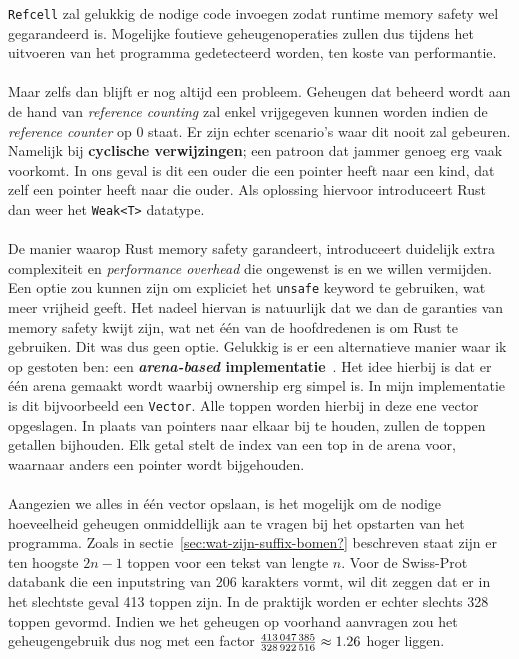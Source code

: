 \texttt{Refcell} zal gelukkig de nodige code invoegen zodat runtime memory safety wel gegarandeerd is.
Mogelijke foutieve geheugenoperaties zullen dus tijdens het uitvoeren van het programma gedetecteerd worden, ten koste van performantie.
\\ \\
Maar zelfs dan blijft er nog altijd een probleem.
Geheugen dat beheerd wordt aan de hand van \textit{reference counting} zal enkel vrijgegeven kunnen worden indien de \textit{reference counter} op 0 staat.
Er zijn echter scenario's waar dit nooit zal gebeuren.
Namelijk bij \textbf{cyclische verwijzingen}; een patroon dat jammer genoeg erg vaak voorkomt.
In ons geval is dit een ouder die een pointer heeft naar een kind, dat zelf een pointer heeft naar die ouder.
Als oplossing hiervoor introduceert Rust dan weer het \texttt{Weak<T>} datatype.
\\ \\
De manier waarop Rust memory safety garandeert, introduceert duidelijk extra complexiteit en \textit{performance overhead} die ongewenst is en we willen vermijden.
Een optie zou kunnen zijn om expliciet het \texttt{unsafe} keyword te gebruiken, wat meer vrijheid geeft.
Het nadeel hiervan is natuurlijk dat we dan de garanties van memory safety kwijt zijn, wat net één van de hoofdredenen is om Rust te gebruiken.
Dit was dus geen optie.
Gelukkig is er een alternatieve manier waar ik op gestoten ben: een \textbf{\textit{arena-based} implementatie}~\cite{rust_arena_trees}.
Het idee hierbij is dat er één arena gemaakt wordt waarbij ownership erg simpel is.
In mijn implementatie is dit bijvoorbeeld een \texttt{Vector}.
Alle toppen worden hierbij in deze ene vector opgeslagen.
In plaats van pointers naar elkaar bij te houden, zullen de toppen getallen bijhouden.
Elk getal stelt de index van een top in de arena voor, waarnaar anders een pointer wordt bijgehouden.
\\ \\
Aangezien we alles in één vector opslaan, is het mogelijk om de nodige hoeveelheid geheugen onmiddellijk aan te vragen bij het opstarten van het programma.
Zoals in sectie~\ref{sec:wat-zijn-suffix-bomen?} beschreven staat zijn er ten hoogste $2n - 1$ toppen voor een tekst van lengte $n$.
Voor de Swiss-Prot databank die een inputstring van 206 karakters vormt, wil dit zeggen dat er in het slechtste geval 413 toppen zijn.
In de praktijk worden er echter slechts 328 toppen gevormd.
Indien we het geheugen op voorhand aanvragen zou het geheugengebruik dus nog met een factor $\frac{413\thinspace047\thinspace385}{328\thinspace922\thinspace516} \approx 1.26$ hoger liggen.
